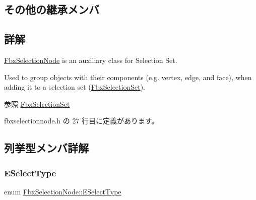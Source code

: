 \subsection*{その他の継承メンバ}


\subsection{詳解}
\hyperlink{class_fbx_selection_node}{Fbx\+Selection\+Node} is an auxiliary class for Selection Set.

Used to group objects with their components (e.\+g. vertex, edge, and face), when adding it to a selection set (\hyperlink{class_fbx_selection_set}{Fbx\+Selection\+Set}). \begin{DoxySeeAlso}{参照}
\hyperlink{class_fbx_selection_set}{Fbx\+Selection\+Set} 
\end{DoxySeeAlso}


 fbxselectionnode.\+h の 27 行目に定義があります。



\subsection{列挙型メンバ詳解}
\mbox{\label{class_fbx_selection_node_aa24cf47b60ff436a1cce9409da37e78f}} 
\subsubsection{\texorpdfstring{E\+Select\+Type}{ESelectType}}
{\footnotesize\ttfamily enum \hyperlink{class_fbx_selection_node_aa24cf47b60ff436a1cce9409da37e78f}{Fbx\+Selection\+Node\+::\+E\+Select\+Type}}

